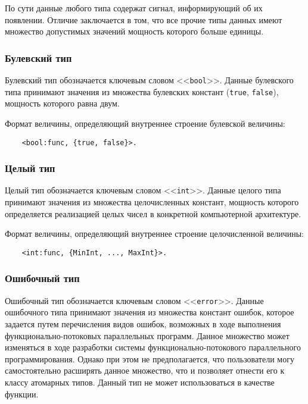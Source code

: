 {По сути данные любого типа содержат сигнал, информирующий об их появлении. Отличие заключается в том, что все прочие типы данных имеют множество допустимых значений мощность которого больше единицы.

\subsubsection{Булевский тип}

Булевский тип обозначается ключевым словом <<\verb|bool|>>. Данные булевского типа принимают значения из множества булевских констант (\verb|true|, \verb|false|), мощность которого равна двум.

Формат величины, определяющий внутреннее строение булевской величины:

\begin{verbatim}
    <bool:func, {true, false}>.
\end{verbatim}

\subsubsection{Целый тип}

Целый тип обозначается ключевым словом <<\verb|int|>>. Данные целого типа принимают значения из множества целочисленных констант, мощность которого определяется реализацией целых чисел в конкретной компьютерной архитектуре.

Формат величины, определяющий внутреннее строение целочисленной величины:

\begin{verbatim}
    <int:func, {MinInt, ..., MaxInt}>.
\end{verbatim}

\subsubsection{Ошибочный тип}

Ошибочный тип обозначается ключевым словом <<\verb|error|>>. Данные ошибочного типа принимают значения из множества констант ошибок, которое задается путем перечисления видов ошибок, возможных в ходе выполнения функционально-потоковых параллельных программ. Данное множество может изменяться в ходе разработки системы функционально-потокового параллельного программирования. Однако при этом не предполагается, что пользователи могу самостоятельно расширять данное множество, что и позволяет отнести его к классу атомарных типов. Данный тип не может использоваться в качестве функции.

}
